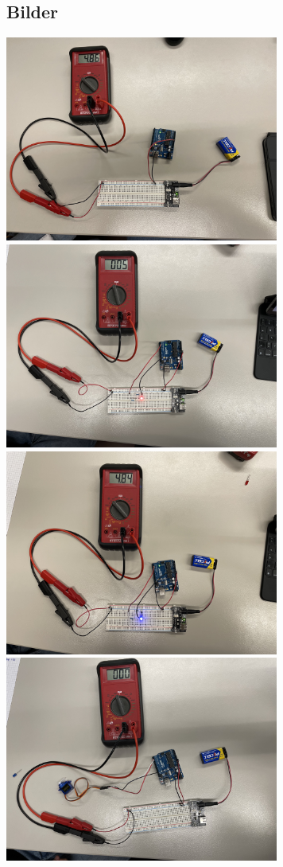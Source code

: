 \documentclass[8pt, letterpaper]{article}
\begin{document}
\subsection{Bilder}
\includegraphics[width=9cm]{aufbau1}
\includegraphics[width=9cm]{aufbau2}
\includegraphics[width=9cm]{aufbau3}
\includegraphics[width=9cm]{aufbau4}
\end{document}
